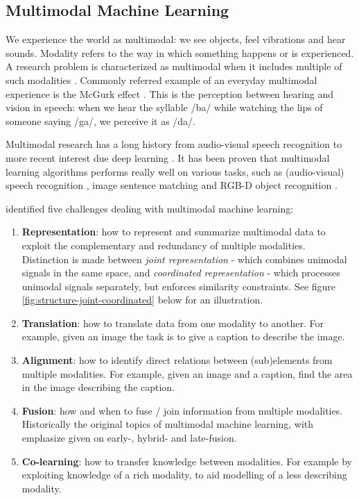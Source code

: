 

\subsection{Multimodal Machine Learning}

We experience the world as multimodal: we see objects, feel vibrations and hear sounds. Modality refers to the way in which something happens or is experienced. A research problem is characterized as multimodal when it includes multiple of such modalities \cite{Baltrusaitis2017}. Commonly referred example of an everyday multimodal experience is the McGurk effect \cite{McGurk1976}. This is the perception between hearing and vision in speech: when we hear the syllable /ba/ while watching the lips of someone saying /ga/, we perceive it as /da/. 

Multimodal research has a long history from audio-visual speech recognition to more recent interest due deep learning \cite{Ngiam2011}. It has been proven that multimodal learning algorithms performs really well on various tasks, such as (audio-visual) speech recognition \cite{Noda2014}, image sentence matching \cite{Ma2015} and RGB-D object recognition \cite{Eitel2015,Xu2017,Sindagi2019}.

 identified five challenges dealing with multimodal machine learning:
\begin{enumerate}
\item \textbf{Representation}: how to represent and summarize multimodal data to exploit the complementary and redundancy of multiple modalities. Distinction is made between \textit{joint representation} - which combines unimodal signals in the same space, and \textit{coordinated representation} - which processes unimodal signals separately, but enforces similarity constraints. See figure \ref{fig:structure-joint-coordinated} below for an illustration.
\item \textbf{Translation}: how to translate data from one modality to another. For example, given an image the task is to give a caption to describe the image.
\item \textbf{Alignment}: how to identify direct relations between (sub)elements from multiple modalities. For example, given an image and a caption, find the area in the image describing the caption.
\item \textbf{Fusion}: how and when to fuse / join information from multiple modalities. Historically the original topics of multimodal machine learning, with emphasize given on early-, hybrid- and late-fusion.
\item \textbf{Co-learning}: how to transfer knowledge between modalities. For example by exploiting knowledge of a rich modality, to aid modelling of a less describing modality.
\end{enumerate}

